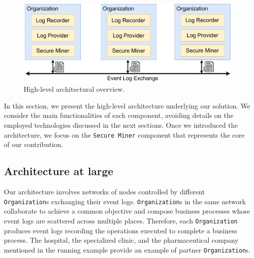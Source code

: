 \begin{figure}[t]
\centering
\includegraphics[width=0.9\linewidth]{content/figures/architecturediagram.pdf}
\caption{High-level architectural overview.}
\label{fig:architecture_diagram}
\end{figure}
In this section, we present the high-level architecture underlying our solution. We consider the main functionalities of each component, avoiding details on the employed technologies discussed in the next sections. Once we introduced the architecture, we focus on the \texttt{Secure Miner} component that represents the core of our contribution.

\subsection{Architecture at large}
Our architecture involves networks of nodes controlled by different \texttt{Organization}s exchanging their event logs. \texttt{Organization}s in the same network collaborate to achieve a common objective and compose business processes whose event logs are scattered across multiple places. Therefore, each \texttt{Organization} produces event logs recording the operations executed to complete a business process. The hospital, the specialized clinic, and the pharmaceutical company mentioned in the running example provide an example of partner \texttt{Organization}s.

